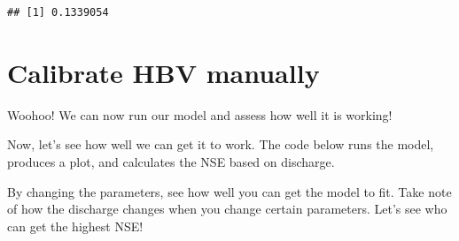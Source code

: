 \documentclass[
]{book}
\begin{document}
\begin{verbatim}
## [1] 0.1339054
\end{verbatim}

\hypertarget{calibrate-hbv-manually}{%
\section{Calibrate HBV manually}\label{calibrate-hbv-manually}}

Woohoo! We can now run our model and assess how well it is working!

Now, let's see how well we can get it to work. The code below runs the model, produces a plot, and calculates the NSE based on discharge.

By changing the parameters, see how well you can get the model to fit. Take note of how the discharge changes when you change certain parameters. Let's see who can get the highest NSE!
\end{document}
